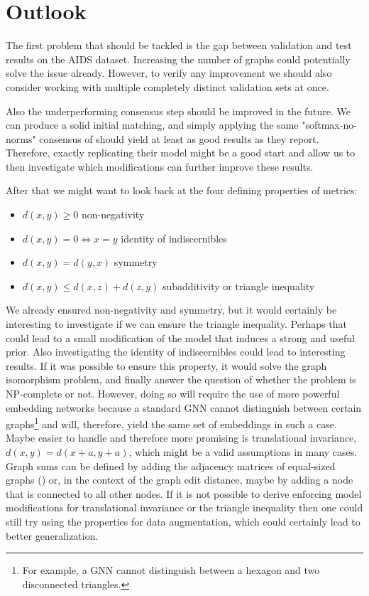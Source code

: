 \section{Outlook}

The first problem that should be tackled is the gap between validation and test results on the AIDS dataset. Increasing the number of graphs could potentially solve the issue already. However, to verify any improvement we should also consider working with multiple completely distinct validation sets at once.

Also the underperforming consensus step should be improved in the future. We can produce a solid initial matching, and simply applying the same "softmax-no-norms" consensus of \cite{fey2020_update} should yield at least as good results as they report. Therefore, exactly replicating their model might be a good start and allow us to then investigate which modifications can further improve these results.

After that we might want to look back at the four defining properties of metrics:
\begin{itemize}
    \itemsep0em
    \item $d(x,y) \ge 0$ non-negativity
    \item $d(x,y) = 0 \Leftrightarrow x = y$ identity of indiscernibles
    \item $d(x,y)  = d(y,x)$ symmetry
    \item $d(x,y) \le d(x,z) + d(z, y)$ subadditivity or triangle inequality
\end{itemize}
We already ensured non-negativity and symmetry, but it would certainly be interesting to investigate if we can ensure the triangle inequality. Perhaps that could lead to a small modification of the model that induces a strong and useful prior. Also investigating the identity of indiscernibles could lead to interesting results. If it was possible to ensure this property, it would solve the graph isomorphism problem, and finally answer the question of whether the problem is NP-complete or not. However, doing so will require the use of more powerful embedding networks because a standard GNN cannot distinguish between certain graphs\footnote{For example, a GNN cannot distinguish between a hexagon and two disconnected triangles.} and will, therefore, yield the same set of embeddings in such a case. Maybe easier to handle and therefore more promising is translational invariance, $d(x,y) = d(x+a,y+a)$, which might be a valid assumptions in many cases. Graph sums can be defined by adding the adjacency matrices of equal-sized graphs (\citealp{graph_sum2004}) or, in the context of the graph edit distance, maybe by adding a node that is connected to all other nodes. If it is not possible to derive enforcing model modifications for translational invariance or the triangle inequality then one could still try using the properties for data augmentation, which could certainly lead to better generalization.

